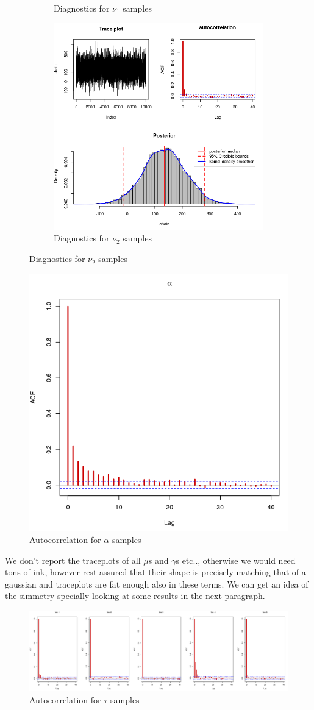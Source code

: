 \documentclass[11pt,twoside]{report}
\begin{document}
\begin{figure}[H]
\begin{subfigure}[H]{0.50\linewidth}
		\caption{Diagnostics for $ \nu_1 $ samples}
		\label{fig:nu_1}
	\end{subfigure}
	\hfill
	\begin{subfigure}[H]{0.50\linewidth}
		\centering
		\includegraphics[width=65 mm]{pictures/nu_2.png}
		\caption{Diagnostics for $ \nu_2 $ samples}
		\label{fig:nu_2}
	\end{subfigure}%
\end{figure}

\begin{figure}[H]
		\centering
		\includegraphics[width=60 mm]{pictures/alpha.png}
		\caption{Autocorrelation for $ \alpha $ samples}
		\label{fig:alpha}
\end{figure}

We don't report the traceplots of all $ \mu $s and $ \gamma $s etc.., otherwise we would need tons of ink, however rest assured that their shape is precisely matching that of a gaussian and traceplots are fat enough also in these terms. We can get an idea of the simmetry specially looking at some results in the next paragraph.

\begin{figure}[H]
		\centering
		\includegraphics[width=160 mm]{pictures/tau.png}
		\caption{Autocorrelation for $ \tau $ samples}
		\label{fig:tau}
\end{figure}
\end{document}
